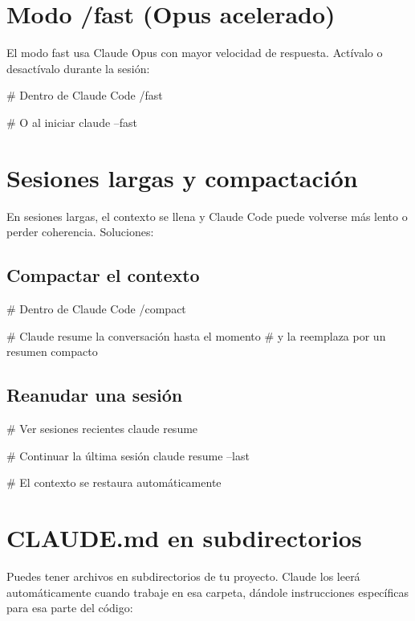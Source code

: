 \documentclass[11pt,a4paper]{report}
\DeclareRobustCommand{\texttt}[1]{{\ttfamily\seqsplit{#1}}}
\begin{document}
\section{Modo /fast (Opus acelerado)}

El modo fast usa Claude Opus con mayor velocidad de respuesta. Actívalo o desactívalo durante la sesión:

\begin{codebox}
# Dentro de Claude Code
/fast

# O al iniciar
claude --fast
\end{codebox}

\section{Sesiones largas y compactación}

En sesiones largas, el contexto se llena y Claude Code puede volverse más lento o perder coherencia. Soluciones:

\subsection{Compactar el contexto}

\begin{codebox}
# Dentro de Claude Code
/compact

# Claude resume la conversación hasta el momento
# y la reemplaza por un resumen compacto
\end{codebox}

\subsection{Reanudar una sesión}

\begin{codebox}
# Ver sesiones recientes
claude resume

# Continuar la última sesión
claude resume --last

# El contexto se restaura automáticamente
\end{codebox}

\section{CLAUDE.md en subdirectorios}

Puedes tener archivos \texttt{CLAUDE.md} en subdirectorios de tu proyecto. Claude los leerá automáticamente cuando trabaje en esa carpeta, dándole instrucciones específicas para esa parte del código:
\end{document}
